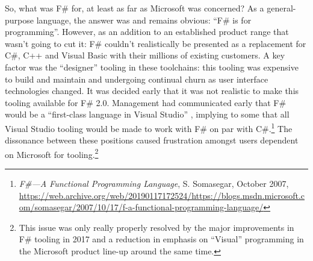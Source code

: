 \documentclass[acmsmall]{acmart}\settopmatter{}
\begin{document}
So, what was F\# for, at least as far as Microsoft was concerned?  As a general-purpose language, the answer was and remains
obvious: “F\# is for programming”.  However, as an addition to an established product range that wasn’t going
to cut it: F\# couldn’t realistically be presented as a replacement for C\#, C++ and Visual Basic with their millions of existing customers.
A key factor was the “designer” tooling in these toolchains: this tooling was expensive to build and maintain and undergoing continual
churn as user interface technologies changed. It was decided early that it was not realistic to make this tooling available for F\# 2.0.
Management had communicated early that F\# would be a “first-class language in Visual Studio” , implying to some that all Visual Studio
tooling would be made to work with F\# on par with C\#.\footnote{\textit{F\#---A Functional Programming Language}, S. Somasegar, October 2007, \url{https://web.archive.org/web/20190117172524/https://blogs.msdn.microsoft.com/somasegar/2007/10/17/f-a-functional-programming-language/}}
The dissonance between these positions caused frustration amongst users dependent on Microsoft for
tooling.\footnote{ This issue was only really properly resolved by the major improvements in F\# tooling in 2017 and a reduction in emphasis on “Visual” programming in the Microsoft product line-up around the same time.}
\end{document}
